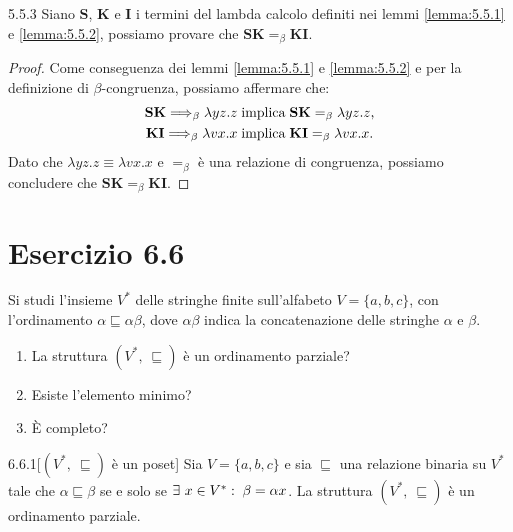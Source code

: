 \begin{customthm}{5.5.3}
Siano $\mathbf{S}$, $\mathbf{K}$ e $\mathbf{I}$ i termini del lambda calcolo definiti nei lemmi \ref{lemma:5.5.1} e \ref{lemma:5.5.2}, possiamo provare che $\mathbf{SK} =_{\beta} \mathbf{KI}$.
\end{customthm}

\begin{proof}
Come conseguenza dei lemmi \ref{lemma:5.5.1} e \ref{lemma:5.5.2} e per la definizione di $\beta$-congruenza, possiamo affermare che:
\begin{align*}
	\mathbf{SK} \Longrightarrow_{\beta} \lambda{yz}.z
		 & \; \text{implica} \; \mathbf{SK} =_{\beta} \lambda{yz}.z \text{,}\\
	\mathbf{KI} \Longrightarrow_{\beta} \lambda{vx}.x 
		 & \; \text{implica} \; \mathbf{KI} =_{\beta} \lambda{vx}.x.
\end{align*}
Dato che $\lambda{yz}.z \equiv \lambda{vx}.x $ e $=_{\beta}$ è una relazione di congruenza, possiamo concludere che $\mathbf{SK} =_{\beta} \mathbf{KI}$.
\end{proof}

\section*{Esercizio 6.6}
{}
\label{es:6.6}

\begin{tcolorbox} \cite{mssc2016}
Si studi l'insieme $V^*$ delle stringhe finite sull'alfabeto $V=\{a,b,c\}$, con l'ordinamento $\alpha \sqsubseteq \alpha\beta$, dove $\alpha\beta$ indica la concatenazione delle stringhe $\alpha$ e $\beta$.
\begin{enumerate}
\item La struttura $(V^*,\ \sqsubseteq )$ è un ordinamento parziale?
\item Esiste l'elemento minimo?
\item \`E completo?
\end{enumerate}
\end{tcolorbox}

\begin{customthm}{6.6.1}[$(V^*,\ \sqsubseteq )$ è un poset]
\label{th:6.6.1}
Sia $V=\{a,b,c\}$ e sia $\sqsubseteq$ una relazione binaria su $V^*$ tale che $\alpha \sqsubseteq \beta$ se e solo se $\exists \ x \in V^* :\; \beta = \alpha x$. La struttura $(V^*,\ \sqsubseteq )$ è un ordinamento parziale.
\end{customthm}

